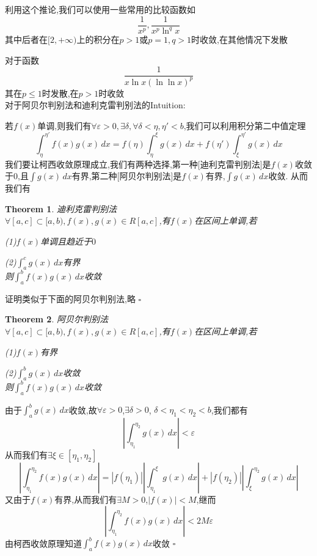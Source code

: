 \documentclass[11pt,hyperref,a4paper,UTF8]{ctexart}
\newtheorem{theorem}{Theorem}[subsection]
\newenvironment{cproof}{%
\heiti{证明}\kaishu
}{%
  \hfill $\square$
  \par\bigskip
}
\newcommand{\abs}[1]{\left|#1\right|}
\begin{document}
\begin{CJK}{UTF8}{gkai}
利用这个推论,我们可以使用一些常用的比较函数如
\[\frac{1}{x^p},\frac{1}{x^p \ln^q x}\]
其中后者在$[2,+\infty)$上的积分在$p > 1$或$p = 1, q > 1$时收敛,在其他情况下发散

对于函数
\[\frac{1}{x \ln x (\ln \ln x)^p}\]
其在$p \leq 1$时发散,在$p > 1$时收敛\\

对于阿贝尔判别法和迪利克雷判别法的Intuition:

若$f(x)$单调,则我们有$\forall \varepsilon > 0, \exists \delta, \forall \delta < \eta,\eta' < b$,我们可以利用积分第二中值定理
\[\int_{\eta}^{\eta'}f(x)g(x)\, dx = f(\eta) \int_{\eta}^{\xi} g(x)\, dx +f(\eta') \int_{\xi}^{\eta'}g(x)\, dx\]
我们要让柯西收敛原理成立,我们有两种选择,第一种[迪利克雷判别法]是$f(x)$收敛于$0$,且$\int g(x)\, dx$有界,第二种[阿贝尔判别法]是$f(x)$有界,$\int g(x)\, dx$收敛. 从而我们有

\begin{theorem}
  迪利克雷判别法\\
   
  $\forall [a,c] \subset [a,b), f(x),g(x) \in R[a,c]$,有$f(x)$在区间上单调,若

  (1)$f(x)$单调且趋近于$0$

  (2)$\int_{a}^{c} g(x)\,dx $有界\\

  则$\int_{a}^{b}f(x)g(x)\, dx$收敛
\end{theorem}

\begin{cproof}
  证明类似于下面的阿贝尔判别法,略
\end{cproof}

\begin{theorem}
  阿贝尔判别法\\

  $\forall [a,c] \subset [a,b), f(x),g(x) \in R[a,c]$,有$f(x)$在区间上单调,若

  (1)$f(x)$有界

  (2)$\int_{a}^{b} g(x)\,dx $收敛\\
  
  则$\int_{a}^{b}f(x)g(x)\, dx$收敛
\end{theorem}

\begin{cproof}
  由于$\int_{a}^{b} g(x)\,dx $收敛,故$\forall \varepsilon > 0$,$\exists \delta > 0$, $\delta < \eta_1 < \eta_2 < b$,我们都有
  \[\abs{\int_{\eta_1}^{\eta_2} g(x)\, dx} < \varepsilon\]
  从而我们有$\exists \xi \in [\eta_1,\eta_2]$
  \[\abs{\int_{\eta_1}^{\eta_2}f(x)g(x)\, dx }= \abs{f(\eta_1)} \abs{\int_{\eta_1}^{\xi} g(x)\, dx }+\abs{f(\eta_2)} \abs{\int_{\xi}^{\eta_2}g(x)\, dx}\]
  又由于$f(x)$有界,从而我们有$\exists M > 0$,$\abs{f(x)} < M$,继而
  \[\abs{\int_{\eta_1}^{\eta_2}f(x)g(x)\, dx } < 2 M\varepsilon\]
  由柯西收敛原理知道$\int_{a}^{b}f(x)g(x)\, dx$收敛
\end{cproof}


\end{CJK}
\end{document}
